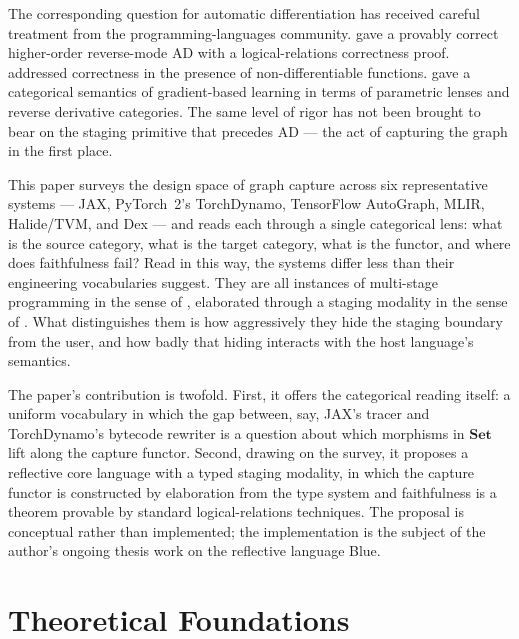 \documentclass[11pt]{report}
\theoremstyle{definition}
\begin{document}
\begin{mainf}
The corresponding question for automatic differentiation has received careful treatment from the programming-languages community. \citet{krawiec-2022} gave a provably correct higher-order reverse-mode AD with a logical-relations correctness proof. \citet{lee-2020} addressed correctness in the presence of non-differentiable functions. \citet{cruttwell-2022} gave a categorical semantics of gradient-based learning in terms of parametric lenses and reverse derivative categories. The same level of rigor has not been brought to bear on the staging primitive that precedes AD --- the act of capturing the graph in the first place.

This paper surveys the design space of graph capture across six representative systems --- JAX, PyTorch~2's TorchDynamo, TensorFlow AutoGraph, MLIR, Halide/TVM, and Dex --- and reads each through a single categorical lens: what is the source category, what is the target category, what is the functor, and where does faithfulness fail? Read in this way, the systems differ less than their engineering vocabularies suggest. They are all instances of multi-stage programming in the sense of \citet{taha-sheard-2000}, elaborated through a staging modality in the sense of \citet{davies-pfenning-2001}. What distinguishes them is how aggressively they hide the staging boundary from the user, and how badly that hiding interacts with the host language's semantics.

The paper's contribution is twofold. First, it offers the categorical reading itself: a uniform vocabulary in which the gap between, say, JAX's tracer and TorchDynamo's bytecode rewriter is a question about which morphisms in $\mathbf{Set}$ lift along the capture functor. Second, drawing on the survey, it proposes a reflective core language with a typed staging modality, in which the capture functor is constructed by elaboration from the type system and faithfulness is a theorem provable by standard logical-relations techniques. The proposal is conceptual rather than implemented; the implementation is the subject of the author's ongoing thesis work on the reflective language Blue.


%
%

\chapter{Theoretical Foundations}
\label{ch:foundations}


\end{mainf}
\end{document}
